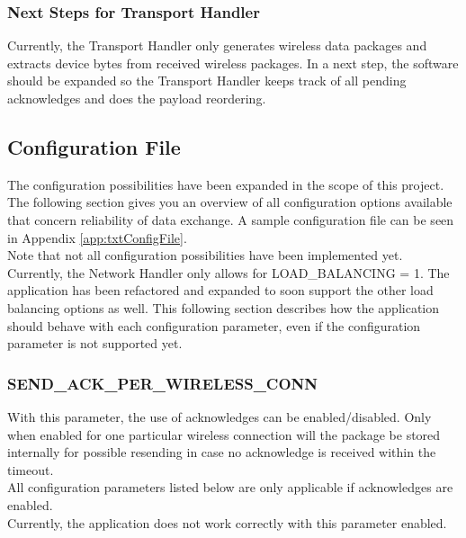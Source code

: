 \subsubsection{Next Steps for Transport Handler}
Currently, the Transport Handler only generates wireless data packages and extracts device bytes from received wireless packages. In a next step, the software should be expanded so the Transport Handler keeps track of all pending acknowledges and does the payload reordering.
%
\subsection{Configuration File} \label{subsec:txtNewConfigOptions}
The configuration possibilities have been expanded in the scope of this project. The following section gives you an overview of all configuration options available that concern reliability of data exchange. A sample configuration file can be seen in Appendix \autoref{app:txtConfigFile}.\\
Note that not all configuration possibilities have been implemented yet. Currently, the Network Handler only allows for LOAD\_BALANCING = 1. The application has been refactored and expanded to soon support the other load balancing options as well. This following section describes how the application should behave with each configuration parameter, even if the configuration parameter is not supported yet.
%
\subsubsection{SEND\_ACK\_PER\_WIRELESS\_CONN}
With this parameter, the use of acknowledges can be enabled/disabled. Only when enabled for one particular wireless connection will the package be stored internally for possible resending in case no acknowledge is received within the timeout.\\
All configuration parameters listed below are only applicable if acknowledges are enabled.\\
Currently, the application does not work correctly with this parameter enabled.
%
